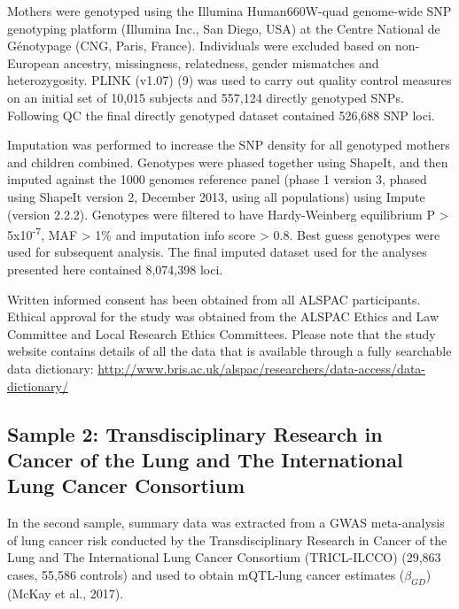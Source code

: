 \documentclass[11pt,twoside]{bristolthesis}
\begin{document}
Mothers were genotyped using the Illumina Human660W-quad genome-wide SNP genotyping platform (Illumina Inc., San Diego, USA) at the Centre National de Génotypage (CNG, Paris, France). Individuals were excluded based on non-European ancestry, missingness, relatedness, gender mismatches and heterozygosity. PLINK (v1.07) (9) was used to carry out quality control measures on an initial set of 10,015 subjects and 557,124 directly genotyped SNPs. Following QC the final directly genotyped dataset contained 526,688 SNP loci.

Imputation was performed to increase the SNP density for all genotyped mothers and children combined. Genotypes were phased together using ShapeIt, and then imputed against the 1000 genomes reference panel (phase 1 version 3, phased using ShapeIt version 2, December 2013, using all populations) using Impute (version 2.2.2). Genotypes were filtered to have Hardy-Weinberg equilibrium P \textgreater{} 5x10\textsuperscript{-7}, MAF \textgreater{} 1\% and imputation info score \textgreater{} 0.8. Best guess genotypes were used for subsequent analysis. The final imputed dataset used for the analyses presented here contained 8,074,398 loci.

Written informed consent has been obtained from all ALSPAC participants. Ethical approval for the study was obtained from the ALSPAC Ethics and Law Committee and Local Research Ethics Committees.
Please note that the study website contains details of all the data that is available through a fully searchable data dictionary: \url{http://www.bris.ac.uk/alspac/researchers/data-access/data-dictionary/}

\hypertarget{sample-2-transdisciplinary-research-in-cancer-of-the-lung-and-the-international-lung-cancer-consortium}{%
\subsection{Sample 2: Transdisciplinary Research in Cancer of the Lung and The International Lung Cancer Consortium}\label{sample-2-transdisciplinary-research-in-cancer-of-the-lung-and-the-international-lung-cancer-consortium}}

In the second sample, summary data was extracted from a GWAS meta-analysis of lung cancer risk conducted by the Transdisciplinary Research in Cancer of the Lung and The International Lung Cancer Consortium (TRICL-ILCCO) (29,863 cases, 55,586 controls) and used to obtain mQTL-lung cancer estimates (\(\beta_{GD}\)) (McKay et al., 2017).
\end{document}
